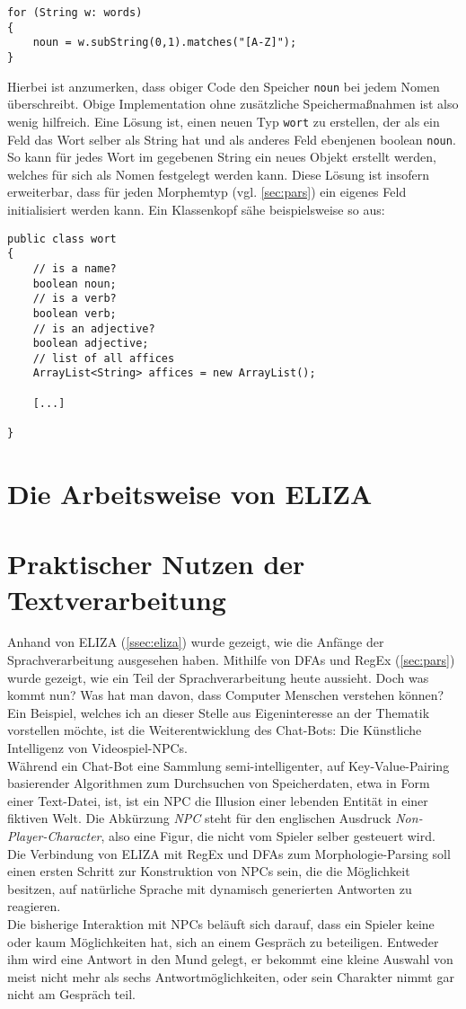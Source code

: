\documentclass[12pt,twoside]{article}
\theoremstyle{plain}
\theoremstyle{definition}
\theoremstyle{remark}
\begin{document}
{\begin{lstlisting}
for (String w: words)
{
	noun = w.subString(0,1).matches("[A-Z]");
}
\end{lstlisting}
Hierbei ist anzumerken, dass obiger Code den Speicher \texttt{noun} bei jedem Nomen überschreibt.
Obige Implementation ohne zusätzliche Speichermaßnahmen ist also wenig hilfreich.
Eine Lösung ist, einen neuen Typ \texttt{wort} zu erstellen, der als ein Feld das Wort selber als String hat und als anderes Feld ebenjenen boolean \texttt{noun}.
So kann für jedes Wort im gegebenen String ein neues Objekt erstellt werden, welches für sich als Nomen festgelegt werden kann.
Diese Lösung ist insofern erweiterbar, dass für jeden Morphemtyp (vgl. \ref{sec:pars}) ein eigenes Feld initialisiert werden kann.
Ein Klassenkopf sähe beispielsweise so aus:
\begin{lstlisting}
public class wort
{
	// is a name?
	boolean noun;
	// is a verb?
	boolean verb;
	// is an adjective?
	boolean adjective;
	// list of all affices
	ArrayList<String> affices = new ArrayList();
	
	[...]

}
\end{lstlisting}
\section{Die Arbeitsweise von ELIZA}
\label{sec:eliza}
\section{Praktischer Nutzen der Textverarbeitung}
\label{sec:ausb}
Anhand von ELIZA (\ref{ssec:eliza}) wurde gezeigt, wie die Anfänge der Sprachverarbeitung ausgesehen haben.
Mithilfe von DFAs und RegEx (\ref{sec:pars}) wurde gezeigt, wie ein Teil der Sprachverarbeitung heute aussieht.
Doch was kommt nun?
Was hat man davon, dass Computer Menschen verstehen können?
Ein Beispiel, welches ich an dieser Stelle aus Eigeninteresse an der Thematik vorstellen möchte, ist die Weiterentwicklung des Chat-Bots: Die Künstliche Intelligenz von Videospiel-NPCs.\\
Während ein Chat-Bot eine Sammlung semi-intelligenter, auf Key-Value-Pairing basierender Algorithmen zum Durchsuchen von Speicherdaten, etwa in Form einer Text-Datei, ist, ist ein NPC die Illusion einer lebenden Entität in einer fiktiven Welt.
Die Abkürzung \textit{NPC} steht für den englischen Ausdruck \textit{Non-Player-Character}, also eine Figur, die nicht vom Spieler selber gesteuert wird.\\
Die Verbindung von ELIZA mit RegEx und DFAs zum Morphologie-Parsing soll einen ersten Schritt zur Konstruktion von NPCs sein, die die Möglichkeit besitzen, auf natürliche Sprache mit dynamisch generierten Antworten zu reagieren.\\
Die bisherige Interaktion mit NPCs beläuft sich darauf, dass ein Spieler keine oder kaum Möglichkeiten hat, sich an einem Gespräch zu beteiligen.
Entweder ihm wird eine Antwort in den Mund gelegt, er bekommt eine kleine Auswahl von meist nicht mehr als sechs Antwortmöglichkeiten, oder sein Charakter nimmt gar nicht am Gespräch teil.
}
\end{document}
